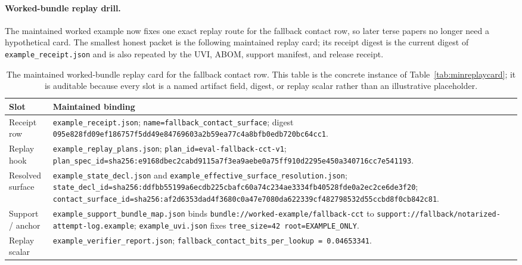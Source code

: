 \documentclass[11pt]{article}
\begin{document}
\paragraph{Worked-bundle replay drill.}
The maintained worked example now fixes one exact replay route for the fallback contact row, so later terse papers no longer need a hypothetical card. The smallest honest packet is the following maintained replay card; its receipt digest is the current digest of \texttt{example\_receipt.json} and is also repeated by the UVI, ABOM, support manifest, and release receipt.

\begin{table}[t]
\centering\scriptsize
\begin{tabularx}{\linewidth}{@{}lX@{}}
\toprule
Slot & Maintained binding \\
\midrule
Receipt row & \nolinkurl{example_receipt.json}; \texttt{name=fallback\_contact\_surface}; digest \nolinkurl{095e828fd09ef186757f5dd49e84769603a2b59ea77c4a8bfb0edb720bc64cc1}. \\
Replay hook & \nolinkurl{example_replay_plans.json}; \texttt{plan\_id=eval-fallback-cct-v1}; \texttt{plan\_spec\_id=}\nolinkurl{sha256:e9168dbec2cabd9115a7f3ea9aebe0a75ff910d2295e450a340716cc7e541193}. \\
Resolved surface & \nolinkurl{example_state_decl.json} and \nolinkurl{example_effective_surface_resolution.json}; \texttt{state\_decl\_id=}\nolinkurl{sha256:ddfbb55199a6ecdb225cbafc60a74c234ae3334fb40528fde0a2ec2ce6de3f20}; \texttt{contact\_surface\_id=}\nolinkurl{sha256:af2d6353dad4f3680c0a47e7080da622339cf482798532d55ccbd8f0cb842c81}. \\
Support / anchor & \nolinkurl{example_support_bundle_map.json} binds \texttt{bundle://worked-example/fallback-cct} to \texttt{support://fallback/notarized-attempt-log.example}; \nolinkurl{example_uvi.json} fixes \texttt{tree\_size=42 root=EXAMPLE\_ONLY}. \\
Replay scalar & \nolinkurl{example_verifier_report.json}; \texttt{fallback\_contact\_bits\_per\_lookup = 0.04653341}. \\
\bottomrule
\end{tabularx}
\caption{The maintained worked-bundle replay card for the fallback contact row. This table is the concrete instance of Table~\ref{tab:minreplaycard}; it is auditable because every slot is a named artifact field, digest, or replay scalar rather than an illustrative placeholder.}
\label{tab:worked-bundle-replay-card}
\end{table}
\end{document}
